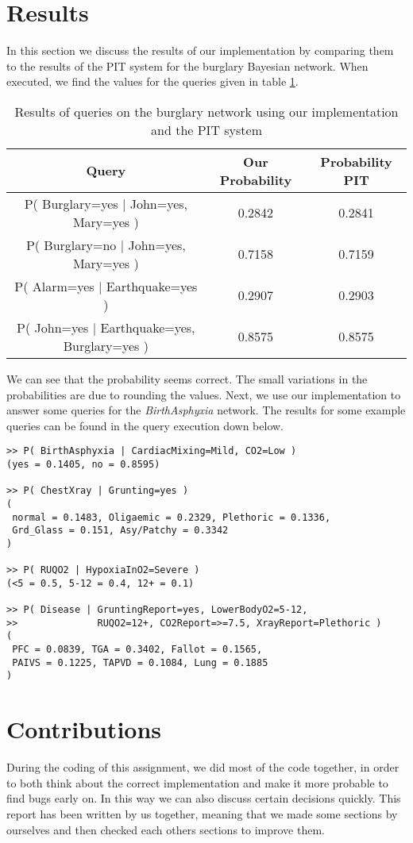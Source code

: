 \documentclass[10pt,a4paper]{article}
\begin{document}
\section{Results}
In this section we discuss the results of our implementation by comparing them to the results of the PIT system for the burglary Bayesian network. When executed, we find the values for the queries given in table \ref{tableburglary}.
\begin{table}[H]
\begin{tabular}{|c|c|c|}
\hline 
\textbf{Query} & \textbf{Our Probability} & \textbf{Probability PIT} \\ 
\hline 
P( Burglary=yes $|$ John=yes, Mary=yes ) & 0.2842 & 0.2841 \\ 
\hline 
P( Burglary=no $|$ John=yes, Mary=yes ) & 0.7158 & 0.7159 \\ 
\hline 
P( Alarm=yes $|$ Earthquake=yes ) & 0.2907 & 0.2903 \\ 
\hline 
P( John=yes $|$ Earthquake=yes, Burglary=yes ) & 0.8575 & 0.8575 \\ 
\hline 
\end{tabular} 
\caption{Results of queries on the burglary network using our implementation and the PIT system}
\label{tableburglary}
\end{table}
We can see that the probability seems correct. The small variations in the probabilities are due to rounding the values. Next, we use our implementation to answer some queries for the \emph{BirthAsphyxia} network. The results for some example queries can be found in the query execution down below.
\begin{verbatim}
>> P( BirthAsphyxia | CardiacMixing=Mild, CO2=Low )
(yes = 0.1405, no = 0.8595)

>> P( ChestXray | Grunting=yes )
(
 normal = 0.1483, Oligaemic = 0.2329, Plethoric = 0.1336, 
 Grd_Glass = 0.151, Asy/Patchy = 0.3342
)

>> P( RUQO2 | HypoxiaInO2=Severe )
(<5 = 0.5, 5-12 = 0.4, 12+ = 0.1)

>> P( Disease | GruntingReport=yes, LowerBodyO2=5-12,
>>              RUQO2=12+, CO2Report=>=7.5, XrayReport=Plethoric )
(
 PFC = 0.0839, TGA = 0.3402, Fallot = 0.1565,
 PAIVS = 0.1225, TAPVD = 0.1084, Lung = 0.1885
)
\end{verbatim}
\section{Contributions}
During the coding of this assignment, we did most of the code together, in order to both think about the correct implementation and make it more probable to find bugs early on. In this way we can also discuss certain decisions quickly. This report has been written by us together, meaning that we made some sections by ourselves and then checked each others sections to improve them.
\end{document}
